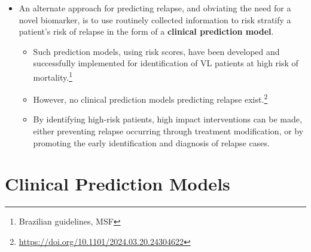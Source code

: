 \documentclass[11pt,a4paper]{article} %
\begin{document}
\begin{itemize}
\begin{enumerate}
\begin{enumerate}
                  \item `Less invasive test-of-cure for kala-azar, PKDL, HIV co-infection and relapse'
                \end{enumerate}
          \item In 2024 the WHO Diagnostic Technical Advisory Group for Neglected Tropical Diseases (DTAG-NTD) published a `Target Product Profile'\footnote{\url{https://www.who.int/publications/i/item/9789240091818}} for an \textit{in vitro} biomarker predicting treatment success. This document recognises the importance of confirming treatment response, and identifying patients at higher risk of subsequent relapse. Further references to the importance of relapse can be found in the
          \item Promising candidate biomarkers for test-of-cure have been explored. For example kDNA detection with qPCR.\footnote{\url{https://doi.org/10.1371/journal.pntd.0012078}, \url{https://doi.org/10.1371/journal.pone.0185606}} However, PCR-based approaches are limited by the need for expertise and high costs, and often lower sensitivity in immunocompetent patients.
        \end{enumerate}
  \item An alternate approach for predicting relapse, and obviating the need for a novel biomarker, is to use routinely collected information to risk stratify a patient's risk of relapse in the form of a \textbf{clinical prediction model}.
        \begin{itemize}
          \item Such prediction models, using risk scores, have been developed and successfully implemented for identification of VL patients at high risk of mortality.\footnote{Brazilian guidelines, MSF}
          \item However, no clinical prediction models predicting relapse exist.\footnote{\url{https://doi.org/10.1101/2024.03.20.24304622}}
          \item By identifying high-risk patients, high impact interventions can be made, either preventing relapse occurring through treatment modification, or by promoting the early identification and diagnosis of relapse cases.
        \end{itemize}
\end{itemize}

\section*{Clinical Prediction Models}
\end{document}
